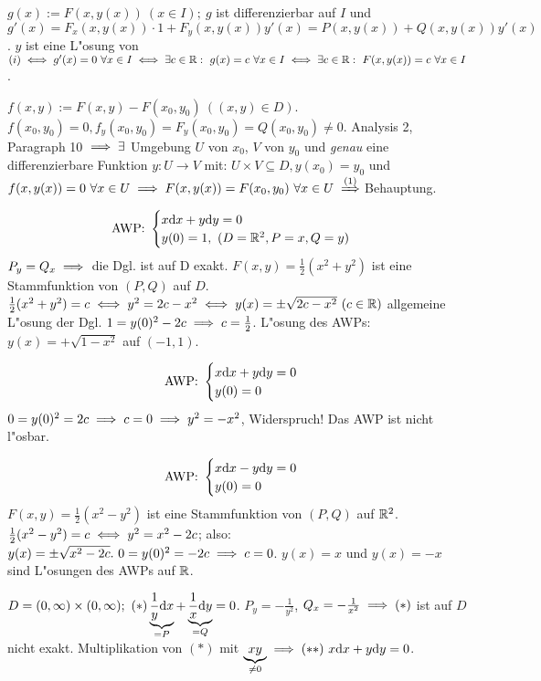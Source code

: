 \documentclass{article}
\begin{document}
\begin{beweise}
\item $g(x):=F(x, y(x))\ (x\in I);\ g$ ist differenzierbar auf $I$ und $g'(x)=F_x(x,y(x))\cdot 1+F_y(x,y(x))y'(x)=P(x,y(x))+Q(x,y(x))y'(x)$.
$y$ ist eine L"osung von $(i)\equizu g'(x)=0\ \forall x\in I\equizu\exists c\in\MdR:\ g(x)=c\ \forall x\in I\equizu\exists c\in\MdR:\ F(x,y(x))=c\ \forall x\in I$.
\item $f(x,y):=F(x,y)-F(x_0, y_0)\ ((x,y)\in D)$. $f(x_0, y_0)=0, f_y(x_0, y_0)=F_y(x_0,y_0)=Q(x_0,y_0)\ne 0$. Analysis 2, Paragraph 10 $\implies \exists$ Umgebung $U$
von $x_0$, $V$ von $y_0$ und \emph{genau} eine differenzierbare Funktion $y:U\to V$ mit: $U\times V\subseteq D, y(x_0)=y_0$ und $f(x,y(x))=0\ \forall x\in U\folgt F(x,y(x))=F(x_0, y_0)\ \forall x\in U\folgtnach{(1)}$Behauptung.
\end{beweise}

\begin{beispiele}
\item $$\text{AWP: }\begin{cases} x \mathrm{d} x + y\mathrm{d} y=0\\ y(0)=1,\ (D=\mathbb{R}^2, P=x, Q=y)\end{cases}$$
$P_y=Q_x\implies$ die Dgl. ist auf D exakt. $F(x,y)=\frac{1}{2}(x^2+y^2)$ ist eine Stammfunktion von $(P, Q)$ auf $D$. $\frac{1}{2}(x^2+y^2)=c\iff y^2=2c-x^2\iff y(x)=\pm \sqrt{2c-x^2}\ (c\in\mathbb{R})$ allgemeine L"osung der Dgl. $1=y(0)^2-2c\implies c=\frac{1}{2}$. L"osung des AWPs: $y(x)=+\sqrt{1-x^2}$ auf $(-1, 1)$.
\item $$\text{AWP: }\begin{cases}x\mathrm{d} x + y\mathrm{d} y=0\\ y(0)=0\end{cases}$$
$0=y(0)^2=2c\implies c=0\implies y^2=-x^2$, Widerspruch! Das AWP ist nicht l"osbar.
\item $$\text{AWP: }\begin{cases}x\mathrm{d} x - y\mathrm{d} y=0\\ y(0)=0\end{cases}$$
$F(x,y)=\frac{1}{2}(x^2-y^2)$ ist eine Stammfunktion von $(P, Q)$ auf $\mathbb{R}^2$. $\frac{1}{2}(x^2-y^2)=c\iff y^2=x^2-2c$; also: $y(x)=\pm\sqrt{x^2-2c}.\ 0=y(0)^2=-2c\folgt c=0$. $y(x)=x$ und $y(x)=-x$ sind L"osungen des AWPs auf $\mathbb{R}$.
\item $D=(0,\infty)\times(0,\infty);\ (*)\underbrace{\frac{1}{y}\ud x}_{=P}+\underbrace{\frac{1}{x}\ud y}_{=Q}=0$. $P_y=-\frac{1}{y^2}$, $Q_x=-\frac{1}{x^2}\implies (*)$ ist auf $D$ nicht exakt. Multiplikation von $(*)$ mit $\underbrace{xy}_{\ne 0}\implies (**)\ x\mathrm{d} x + y\mathrm{d} y=0$.
\end{beispiele}
\end{document}
